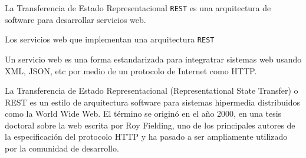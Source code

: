 La Transferencia de Estado Representacional \texttt{REST} es una arquitectura
de software para desarrollar servicios web.

Los servicios web que implementan una arquitectura \texttt{REST}


Un servicio web es una forma estandarizada para integratrar sistemas web usando XML, JSON, etc por medio de un protocolo de Internet como HTTP.

La Transferencia de Estado Representacional (Representational State Transfer) o
REST es un estilo de arquitectura software para sistemas hipermedia distribuidos
como la World Wide Web. El término se originó en el año 2000, en una tesis doctoral
sobre la web escrita por Roy Fielding, uno de los principales autores de la
especificación del protocolo HTTP y ha pasado a ser ampliamente utilizado por
la comunidad de desarrollo.
